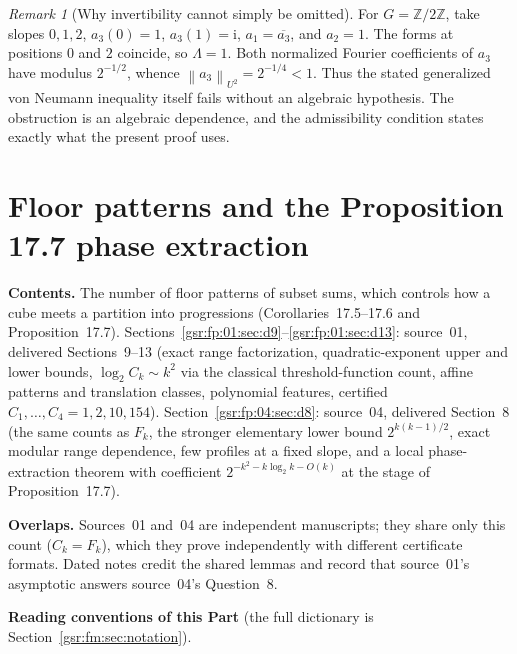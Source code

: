 \documentclass[11pt,letterpaper]{article}
\numberwithin{equation}{section}
\theoremstyle{definition}
\theoremstyle{remark}
\newtheorem{remark}[theorem]{Remark}
\newcommand{\Z}{\mathbb Z}
\newcommand{\1}{\mathbf 1}
\newcommand{\norm}[1]{\left\|#1\right\|}
\newcommand{\partsource}[1]{\par\noindent\begin{minipage}{\textwidth}\small #1\end{minipage}\par\medskip}
\begin{document}
\begin{remark}[Why invertibility cannot simply be omitted]
For \(G=\Z/2\Z\), take slopes \(0,1,2\),
\(a_3(0)=1\), \(a_3(1)=\mathrm i\),
\(a_1=\overline{a_3}\), and \(a_2=1\).
The forms at positions \(0\) and \(2\) coincide, so \(\Lambda=1\).
Both normalized Fourier coefficients of \(a_3\) have modulus
\(2^{-1/2}\), whence \(\norm{a_3}_{U^2}=2^{-1/4}<1\).
Thus the stated generalized von Neumann inequality itself fails
without an algebraic hypothesis.
The obstruction is an algebraic dependence, and the admissibility
condition states exactly what the present proof uses.
\end{remark}



\clearpage
\part{Floor patterns and the Proposition 17.7 phase extraction}\label{gsr:fp:part}
\partsource{
\textbf{Contents.} The number of floor patterns of subset sums, which controls how a cube meets a partition into progressions (Corollaries~17.5--17.6 and Proposition~17.7). Sections~\ref{gsr:fp:01:sec:d9}--\ref{gsr:fp:01:sec:d13}: source~01, delivered Sections~9--13 (exact range factorization, quadratic-exponent upper and lower bounds, $\log_2C_k\sim k^2$ via the classical threshold-function count, affine patterns and translation classes, polynomial features, certified $C_1,\ldots,C_4=1,2,10,154$). Section~\ref{gsr:fp:04:sec:d8}: source~04, delivered Section~8 (the same counts as $F_k$, the stronger elementary lower bound $2^{k(k-1)/2}$, exact modular range dependence, few profiles at a fixed slope, and a local phase-extraction theorem with coefficient $2^{-k^2-k\log_2k-O(k)}$ at the stage of Proposition~17.7).

\textbf{Overlaps.} Sources~01 and~04 are independent manuscripts; they share only this count ($C_k=F_k$), which they prove independently with different certificate formats. Dated notes credit the shared lemmas and record that source~01's asymptotic answers source~04's Question~8.
}
\noindent\textbf{Reading conventions of this Part} (the full dictionary is Section~\ref{gsr:fm:sec:notation}).
\end{document}
